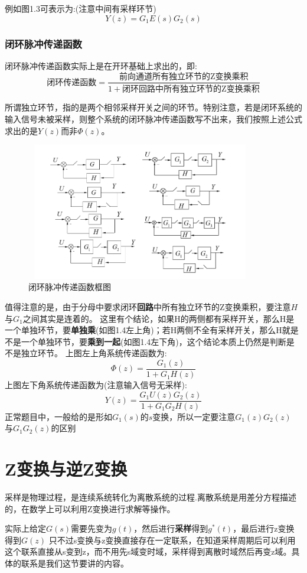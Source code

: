 \documentclass[12pt, a4paper, oneside]{ctexbook}
\begin{document}
例如图1.3可表示为:(注意中间有采样环节)
$$
Y(z)=G_1E(s)G_2(s)
$$
\subsubsection{闭环脉冲传递函数}
闭环脉冲传递函数实际上是在开环基础上求出的，即:
$$
\mbox{闭环传递函数}=\frac{\mbox{前向通道所有独立环节的Z变换乘积}}{1+\mbox{闭环回路中所有独立环节的Z变换乘积}}
$$

所谓独立环节，指的是两个相邻采样开关之间的环节。特别注意，若是闭环系统的输入信号未被采样，则整个系统的闭环脉冲传递函数写不出来，我们按照上述公式求出的是$Y(z)$而非$\Phi(z)$。

\begin{figure}[htbp]
	\centering
	\includegraphics[width=10cm,height=6cm]{img/1_3.png}
	\caption{闭环脉冲传递函数框图}
\end{figure}

值得注意的是，由于分母中要求闭环\textbf{回路}中所有独立环节的Z变换乘积，要注意$H$与$G_1$之间其实是连着的。
这里有个结论，如果H的两侧都有采样开关，那么H是一个单独环节，要\textbf{单独乘}(如图1.4左上角)；若H两侧不全有采样开关，那么H就是不是一个单独环节，要\textbf{乘到一起}(如图1.4左下角)，这个结论本质上仍然是判断是不是独立环节。
上图左上角系统传递函数为:
$$
\Phi(z)=\frac{G_1(z)}{1+G_1H(z)}
$$
上图左下角系统传递函数为(注意输入信号无采样):
$$
Y(z)=\frac{G_1U(z)G_2(z)}{1+G_1G_2H(z)}
$$
正常题目中，一般给的是形如$G_1(s)$的$s$变换，所以一定要注意$G_1(z)G_2(z)$
与$G_1G_2(z)$的区别
\section{Z变换与逆Z变换}
采样是物理过程，是连续系统转化为离散系统的过程.离散系统是用差分方程描述的，在数学上可以利用Z变换进行求解等操作。

实际上给定$G(s)$需要先变为$g(t)$，然后进行\textbf{采样}得到$g^*(t)$，最后进行z变换得到$G(z)$
只不过s变换与z变换直接存在一定联系，在知道采样周期后可以利用这个联系直接从s变到z，而不用先s域变时域，采样得到离散时域然后再变z域。具体的联系是我们这节要讲的内容。
\end{document}
